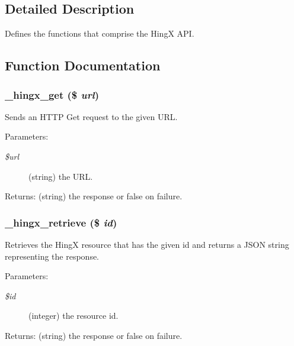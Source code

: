 \subsection{Detailed Description}
Defines the functions that comprise the Hing\-X API. 



\subsection{Function Documentation}
\subsubsection{\setlength{\rightskip}{0pt plus 5cm}\_\-hingx\_\-get (\$ {\em url})}\label{hingx_8inc_f9bd3e9ed8f73c0aaab2ebaf8efac3a4}


Sends an HTTP Get request to the given URL. 

\begin{Desc}
\item[Parameters:]
\begin{description}
\item[{\em \$url}](string) the URL. \end{description}
\end{Desc}
\begin{Desc}
\item[Returns:](string) the response or false on failure. \end{Desc}
\subsubsection{\setlength{\rightskip}{0pt plus 5cm}\_\-hingx\_\-retrieve (\$ {\em id})}\label{hingx_8inc_591a519a7be6fe09d0ad26360b44cac9}


Retrieves the Hing\-X resource that has the given id and returns a JSON string representing the response. 

\begin{Desc}
\item[Parameters:]
\begin{description}
\item[{\em \$id}](integer) the resource id. \end{description}
\end{Desc}
\begin{Desc}
\item[Returns:](string) the response or false on failure. \end{Desc}
